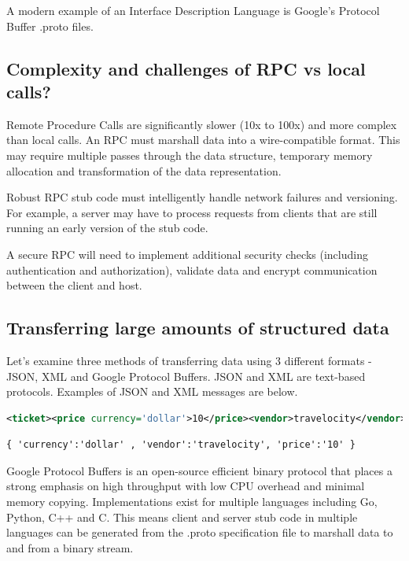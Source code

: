 A modern example of an Interface Description Language is Google's Protocol Buffer .proto files.

\subsection{Complexity and challenges of RPC vs local calls?}

Remote Procedure Calls are significantly slower (10x to 100x) and more complex than local calls.
An RPC must marshall data into a wire-compatible format.
This may require multiple passes through the data structure, temporary memory allocation and transformation of the data representation.

Robust RPC stub code must intelligently handle network failures and versioning.
For example, a server may have to process requests from clients that are still running an early version of the stub code.

A secure RPC will need to implement additional security checks (including authentication and authorization), validate data and encrypt communication between the client and host.

\subsection{Transferring large amounts of structured data}

Let's examine three methods of transferring data using 3 different formats - JSON, XML and Google Protocol Buffers.
JSON and XML are text-based protocols.
Examples of JSON and XML messages are below.

\begin{lstlisting}[language=XML]
<ticket><price currency='dollar'>10</price><vendor>travelocity</vendor></ticket>
\end{lstlisting}

\begin{lstlisting}
{ 'currency':'dollar' , 'vendor':'travelocity', 'price':'10' }
\end{lstlisting}

Google Protocol Buffers is an open-source efficient binary protocol that places a strong emphasis on high throughput with low CPU overhead and minimal memory copying.
Implementations exist for multiple languages including Go, Python, C++ and C.
This means client and server stub code in multiple languages can be generated from the .proto specification file to marshall data to and from a binary stream.


